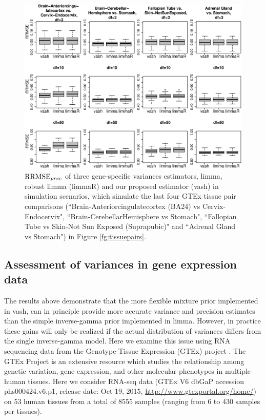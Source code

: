 \documentclass{bioinfo}
\begin{document}
\begin{figure}[!hbp]
\includegraphics[width=\linewidth]{rmse_gtex.eps}
\caption{$\textrm{RRMSE}_{prec}$ of three gene-specific variances estimators, limma, robust limma (limmaR) and our proposed estimator (vash) in simulation scenarios, which simulate the last four GTEx tissue pair comparisons (``Brain-Anteriorcingulatecortex (BA24) vs Cervix-Endocervix", ``Brain-CerebellarHemisphere vs Stomach", ``Fallopian Tube vs Skin-Not Sun Exposed (Suprapubic)" and ``Adrenal Gland vs Stomach") in Figure \ref{fg:tissuepairs}.}
\label{fg:rmsegtex}
\end{figure}

\subsection{Assessment of variances in gene expression data}

The results above demonstrate that the more flexible mixture prior implemented in vash, can in principle provide more accurate variance and precision estimates than
the simple inverse-gamma prior implemented in limma. However, in practice these gains will only be realized if the actual distribution of variances differs from the single inverse-gamma model. Here
we examine this issue using RNA sequencing data from the Genotype-Tissue Expression (GTEx) project \citep{gtex}. The GTEx Project is an extensive resource which studies the relationship among genetic variation, gene expression, and other molecular phenotypes in multiple human tissues. Here we consider RNA-seq data (GTEx V6 dbGaP accession phs000424.v6.p1, release date: Oct 19, 2015, \href{http://www.gtexportal.org/home/}{http://www.gtexportal.org/home/}) on 53 human tissues from a total of 8555 samples (ranging from 6 to 430 samples per tissues).
 
\end{document}
